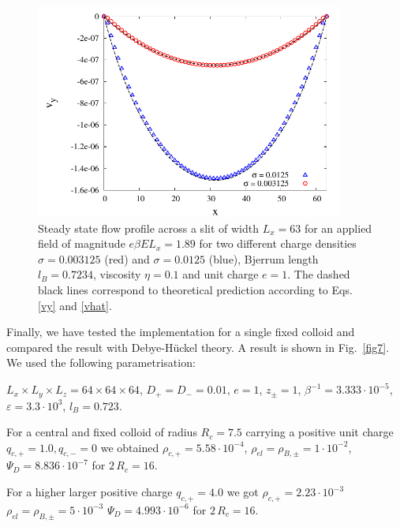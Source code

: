 \documentclass[aps,pre,preprint,groupedaddress]{revtex4-1}
\newcommand{\e}[1]{\cdot10^{#1}}
\begin{document}
\begin{figure}[h!t]
\includegraphics[width=0.9\textwidth]{test_eo.pdf}
\caption{Steady state flow profile across a slit of width $L_x=63$ for an applied field of magnitude $e \beta E L_x=1.89$ for two different charge densities $\sigma=0.003125$ (red) and $\sigma=0.0125$ (blue), Bjerrum length $l_B=0.7234$, viscosity $\eta=0.1$ and unit charge $e=1$. The dashed black lines correspond to theoretical prediction according to Eqs. \ref{vy} and \ref{vhat}.} 
\label{fig6} 
\end{figure}

Finally, we have tested the implementation for a single fixed
colloid and compared the result with Debye-H\"uckel theory. A result
is shown in Fig.~\ref{fig7}.
We used the following parametrisation:

$L_x \times L_y \times L_z=64\times64\times64$,
$D_+=D_-=0.01$,
$e=1$, 
$z_{\pm}=1$,
$\beta^{-1}=3.333\e{-5}$,
$\varepsilon=3.3\e{3}$,
$l_B=0.723$.

For a central and fixed colloid of radius $R_c=7.5$ carrying a positive unit charge
$q_{c,+}=1.0, q_{c,-}=0$ we obtained 
$\rho_{c,+}=5.58\e{-4}$,
$\rho_{el}=\rho_{B,\pm}=1\e{-2}$, 
$\Psi_D=8.836\e{-7}$ for $2\,R_c=16$.

For a higher larger positive charge $q_{c,+}=4.0$ we got
$\rho_{c,+}=2.23\e{-3}$
$\rho_{el}=\rho_{B,\pm}=5\e{-3}$ 
$\Psi_D=4.993\e{-6}$ for $2\,R_c=16$.
\end{document}
